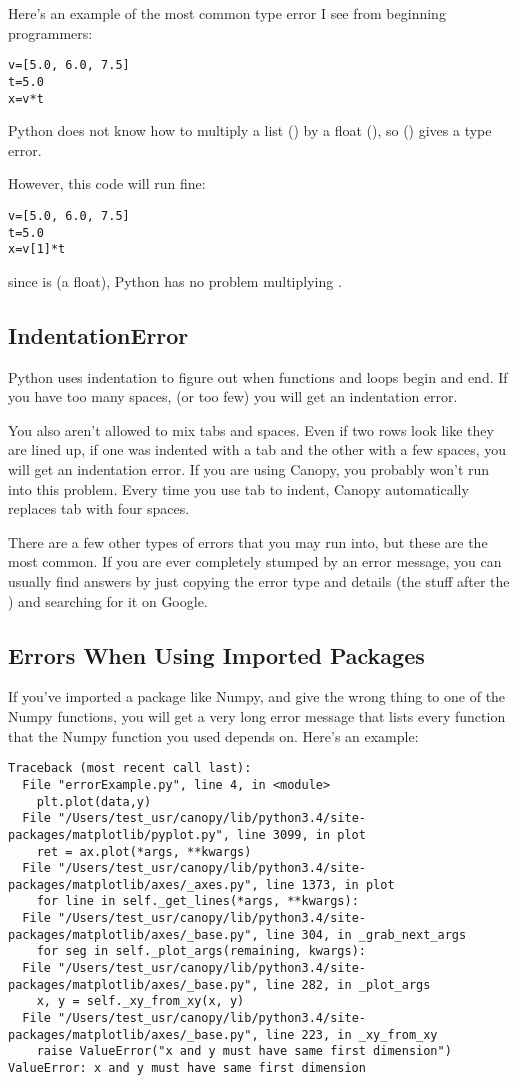 Here's an example of the most common type error I see from beginning programmers:
\begin{Verbatim}
v=[5.0, 6.0, 7.5]
t=5.0
x=v*t
\end{Verbatim}
Python does not know how to multiply a list () by a float (), so () gives a type error.

However, this code will run fine:
\begin{Verbatim}
v=[5.0, 6.0, 7.5]
t=5.0
x=v[1]*t
\end{Verbatim}
since  is  (a float), Python has no problem multiplying .

\subsection*{IndentationError}
Python uses indentation to figure out when functions and loops begin and end.  If you have too many spaces, (or too few) you will get an indentation error.

You also aren't allowed to mix tabs and spaces.  Even if two rows look like they are lined up, if one was indented with a tab and the other with a few spaces, you will get an indentation error.  If you are using Canopy, you probably won't run into this problem. Every time you use tab to indent, Canopy automatically replaces tab with four spaces.

There are a few other types of errors that you may run into, but these are the most common.  If you are ever completely stumped by an error message, you can usually find answers by just copying the error type and details (the stuff after the \code{:}) and searching for it on Google.

\subsection*{Errors When Using Imported Packages}
If you've imported a package like Numpy, and give the wrong thing to one of the Numpy functions, you will get a very long error message that lists every function that the Numpy function you used depends on.  Here's an example:

\begin{Verbatim}
Traceback (most recent call last):
  File "errorExample.py", line 4, in <module>
    plt.plot(data,y)
  File "/Users/test_usr/canopy/lib/python3.4/site-packages/matplotlib/pyplot.py", line 3099, in plot
    ret = ax.plot(*args, **kwargs)
  File "/Users/test_usr/canopy/lib/python3.4/site-packages/matplotlib/axes/_axes.py", line 1373, in plot
    for line in self._get_lines(*args, **kwargs):
  File "/Users/test_usr/canopy/lib/python3.4/site-packages/matplotlib/axes/_base.py", line 304, in _grab_next_args
    for seg in self._plot_args(remaining, kwargs):
  File "/Users/test_usr/canopy/lib/python3.4/site-packages/matplotlib/axes/_base.py", line 282, in _plot_args
    x, y = self._xy_from_xy(x, y)
  File "/Users/test_usr/canopy/lib/python3.4/site-packages/matplotlib/axes/_base.py", line 223, in _xy_from_xy
    raise ValueError("x and y must have same first dimension")
ValueError: x and y must have same first dimension
\end{Verbatim}

